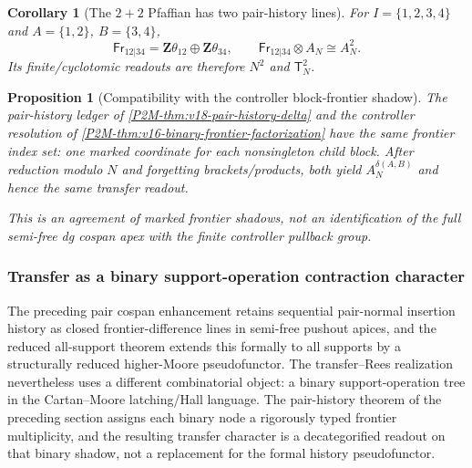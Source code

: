 \documentclass[11pt]{article}
\newtheorem{proposition}[theorem]{Proposition}
\newtheorem{corollary}[theorem]{Corollary}
\theoremstyle{remark}
\newcommand{\Z}{\mathbf Z}
\begin{document}
\begin{corollary}[The $2+2$ Pfaffian has two pair-history lines]
\label{P2M-cor:v18-two-two-pair-history}
For $I=\{1,2,3,4\}$ and $A=\{1,2\}$, $B=\{3,4\}$,
\[
 \boxed{
 \mathsf{Fr}_{12|34}
 =\Z\theta_{12}\oplus\Z\theta_{34},
 \qquad
 \mathsf{Fr}_{12|34}\otimes A_N\cong A_N^2.}
\]
Its finite/cyclotomic readouts are therefore $N^2$ and $\mathsf T_N^2$.
\end{corollary}

\begin{proposition}[Compatibility with the controller block-frontier shadow]
\label{P2M-prop:v18-pair-controller-agreement}
The pair-history ledger of \cref{P2M-thm:v18-pair-history-delta} and the controller
resolution of \cref{P2M-thm:v16-binary-frontier-factorization} have the same
frontier index set: one marked coordinate for each nonsingleton child block.
After reduction modulo $N$ and forgetting brackets/products, both yield
$A_N^{\delta(A,B)}$ and hence the same transfer readout.

This is an agreement of marked frontier shadows, not an identification of the
full semi-free dg cospan apex with the finite controller pullback group.
\end{proposition}


\subsubsection{Transfer as a binary support-operation contraction character}


The preceding pair cospan enhancement retains sequential pair-normal insertion history as closed frontier-difference lines in semi-free pushout apices, and the reduced all-support theorem extends this formally to all supports by a structurally reduced higher-Moore pseudofunctor.  The transfer--Rees realization nevertheless uses a different combinatorial object: a binary support-operation tree in the Cartan--Moore latching/Hall language.  The pair-history theorem of the preceding section assigns each binary node a rigorously typed frontier multiplicity, and the resulting transfer character is a decategorified readout on that binary shadow, not a replacement for the formal history pseudofunctor.
\end{document}
